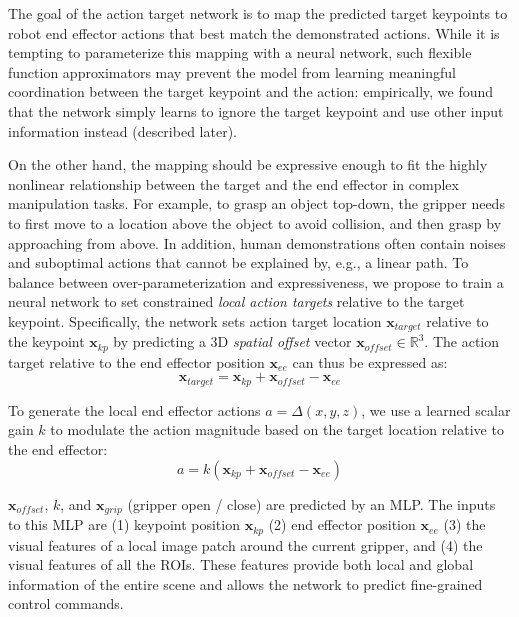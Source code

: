 \documentclass[letterpaper, 10 pt, conference]{ieeeconf}
\begin{document}
The goal of the action target network is to map the predicted target keypoints to robot end effector actions that best match the demonstrated actions. While it is tempting to parameterize this mapping with a neural network, such flexible function approximators may prevent the model from learning meaningful coordination between the target keypoint and the action: empirically, we found that the network simply learns to ignore the target keypoint and use other input information instead (described later). 

On the other hand, the mapping should be expressive enough to fit the highly nonlinear relationship between the target and the end effector in complex manipulation tasks.
For example, to grasp an object top-down, the gripper needs to first move to a location above the object to avoid collision, and then grasp by approaching from above. In addition, human demonstrations often contain noises and suboptimal actions that cannot be explained by, e.g., a linear path.
To balance between over-parameterization and expressiveness, we propose to train a neural network to set constrained \emph{local action targets} relative to the target keypoint.
Specifically, the network sets action target location $\mathbf{x}_{target}$ relative to the keypoint $\mathbf{x}_{kp}$ by predicting a 3D \emph{spatial offset} vector $\mathbf{x}_{offset} \in \mathbb{R}^3$. The action target relative to the end effector position $\mathbf{x}_{ee}$ can thus be expressed as:
\begin{equation}
    \mathbf{x}_{target} = \mathbf{x}_{kp} + \mathbf{x}_{offset} - \mathbf{x}_{ee}
    \label{eq:offset}
\end{equation}

To generate the local end effector actions $a =\Delta(x, y, z)$, we use a learned scalar gain $k$ to modulate the action magnitude based on the target location relative to the end effector:
\begin{equation}
    a = k (\mathbf{x}_{kp} + \mathbf{x}_{offset} - \mathbf{x}_{ee})
    \label{eq:action_calc}
\end{equation}

$\mathbf{x}_{offset}$, $k$, and $\mathbf{x}_{grip}$ (gripper open / close) are predicted by an MLP. The inputs to this MLP are (1) keypoint position $\mathbf{x}_{kp}$ (2) end effector position $\mathbf{x}_{ee}$ (3) the visual features of a local image patch around the current gripper, and (4) the visual features of all the ROIs. These features provide both local and global information of the entire scene and allows the network to predict fine-grained control commands.
\end{document}
